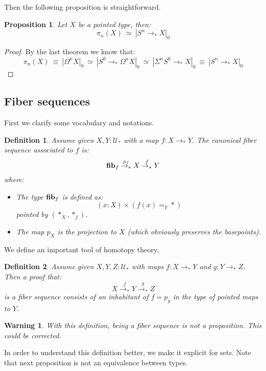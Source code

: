 \documentclass{article}
\newcommand{\sse}[1]{\medbreak \subsection{#1}}
\newcommand{\U}{{\mathcal U}}
\renewcommand{\r}{\rightarrow}
\newcommand{\fib}{\mathrm{\bf fib}}
\newtheorem{definition}{Definition}
\newtheorem{proposition}{Proposition}
\newtheorem{warning}{\danger Warning}
\begin{document}
Then the following proposition is straightforward.

\begin{proposition}
Let $X$ be a pointed type, then:
\[\pi_n(X) \ \simeq \ |S^n\r_* X|_0\]
\end{proposition}
\begin{proof}
By the last theorem we know that:
\[\pi_n(X) \ \equiv\ |\Omega^nX|_0 \ \simeq \ |S^0\r_*\Omega^nX|_0\ \simeq\ |\Sigma^nS^0\r_*X|_0 \ \equiv\ |S^n\r_*X|_0\]
\end{proof}


\sse{Fiber sequences}

First we clarify some vocabulary and notations.

\begin{definition}
Assume given $X,Y:\U_*$ with a map $f:X\r_* Y$. The canonical fiber sequence associated to $f$ is:
\[\fib_f \overset{p_f}{\r_*} X \overset{f}{\r_*} Y\]
where:
\begin{itemize}
\item The type $\fib_f$ is defined as:
\[(x:X)\times (f(x)=_Y*)\] 
pointed by $(*_X,*_f)$.
\item The map $p_X$ is the projection to $X$ (which obviously preserves the basepoints).
\end{itemize}
\end{definition}

We define an important tool of homotopy theory. %

\begin{definition}
Assume given $X,Y,Z:\U_*$ with maps $f:X\r_* Y$ and $g:Y\r_* Z$. Then a proof that:
\[X \overset{f}{\r_*} Y\overset{g}{\r_*} Z\]
is a fiber sequence consists of an inhabitant of $f=p_g$ in the type of pointed maps to $Y$.
\end{definition}

\begin{warning}
With this definition, being a fiber sequence is not a proposition. This could be corrected. 
\end{warning}

In order to understand this definition better, we make it explicit for sets. Note that next proposition is not an equivalence between types.
\end{document}
